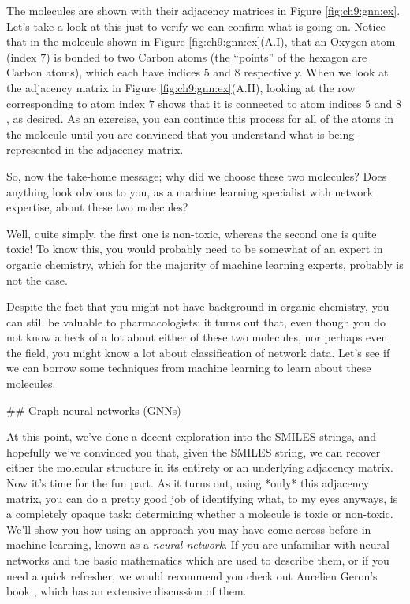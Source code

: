The molecules are shown with their adjacency matrices in Figure \ref{fig:ch9:gnn:ex}. Let's take a look at this just to verify we can confirm what is going on. Notice that in the molecule shown in Figure \ref{fig:ch9:gnn:ex}(A.I), that an Oxygen atom (index $7$) is bonded to two Carbon atoms (the ``points'' of the hexagon are Carbon atoms), which each have indices $5$ and $8$ respectively. When we look at the adjacency matrix in Figure \ref{fig:ch9:gnn:ex}(A.II), looking at the row corresponding to atom index $7$ shows that it is connected to atom indices $5$ and $8$, as desired. As an exercise, you can continue this process for all of the atoms in the molecule until you are convinced that you understand what is being represented in the adjacency matrix.

So, now the take-home message; why did we choose these two molecules? Does anything look obvious to you, as a machine learning specialist with network expertise, about these two molecules?

Well, quite simply, the first one is non-toxic, whereas the second one is quite toxic! To know this, you would probably need to be somewhat of an expert in organic chemistry, which for the majority of machine learning experts, probably is not the case.

Despite the fact that you might not have background in organic chemistry, you can still be valuable to pharmacologists: it turns out that, even though you do not know a heck of a lot about either of these two molecules, nor perhaps even the field, you might know a lot about classification of network data. Let's see if we can borrow some techniques from machine learning to learn about these molecules.


## Graph neural networks (GNNs)

At this point, we've done a decent exploration into the SMILES strings, and hopefully we've convinced you that, given the SMILES string, we can recover either the molecular structure in its entirety or an underlying adjacency matrix. Now it's time for the fun part. As it turns out, using *only* this adjacency matrix, you can do a pretty good job of identifying what, to my eyes anyways, is a completely opaque task: determining whether a molecule is toxic or non-toxic. We'll show you how using an approach you may have come across before in machine learning, known as a \textit{neural network}. If you are unfamiliar with neural networks and the basic mathematics which are used to describe them, or if you need a quick refresher, we would recommend you check out Aurelien Geron's book \cite{Geron2017Mar}, which has an extensive discussion of them.

